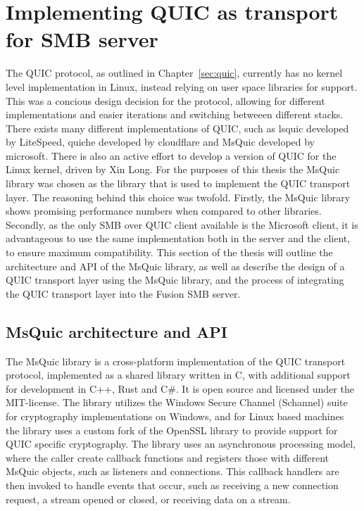 \documentclass[english, 12pt, a4paper, elec, utf8, a-2b, online]{aaltothesis}
\begin{document}
\section{Implementing QUIC as transport for SMB server}
\label{sec:implementation}
The QUIC protocol, as outlined in Chapter~\ref{sec:quic}, currently has no kernel
level implementation in Linux, instead relying on user space libraries for support.
This was a concious design decision for the protocol, allowing for different
implementations and easier iterations and switching betweeen different stacks.
There exists many different implementations of QUIC, such as lsquic developed by
LiteSpeed, quiche developed by cloudflare and MsQuic developed by microsoft\cite{quic_implementations}.
There is also an active effort to develop a version of QUIC for the Linux kernel,
driven by Xin Long\cite{quic_linux_kernel}. For the purposes of this thesis the
MsQuic library was chosen as the library that is used to implement the QUIC transport
layer. The reasoning behind this choice was twofold. Firstly, the MsQuic library
shows promising performance numbers when compared to other libraries\cite{quic_perf}.
Secondly, as the only SMB over QUIC client available is the Microsoft client, it is
advantageous to use the same implementation both in the server and the client,
to ensure maximum compatibility. This section of the thesis will outline the
architecture and API of the MsQuic library, as well as describe the design of
a QUIC transport layer using the MsQuic library, and the process of integrating
the QUIC transport layer into the Fusion SMB server.

\subsection{MsQuic architecture and API}
\label{sec:msquic}
The MsQuic library is a cross-platform implementation of the QUIC transport protocol,
implemented as a shared library written in C, with additional support for development
in C++, Rust and C\#. It is open source and licensed under the MIT-license. The library
utilizes the Windows Secure Channel (Schannel) suite for cryptography implementations
on Windows, and for Linux based machines the library uses a custom fork of the
OpenSSL library to provide support for QUIC specific cryptography\cite{msquic}. The
library uses an asynchronous processing model, where the caller create callback functions
and registers those with different MsQuic objects, such as listeners and connections.
This callback handlers are then invoked to handle events that occur, such as receiving
a new connection request, a stream opened or closed, or receiving data on a stream\cite{msquic_docs}. 
\end{document}
